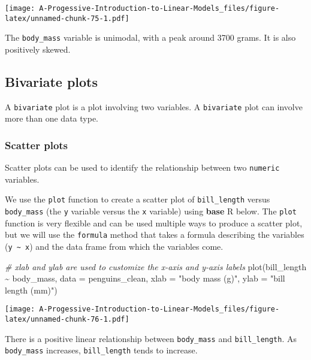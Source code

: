 \documentclass[
]{book}
\newenvironment{Shaded}{\begin{snugshade}}{\end{snugshade}}
\newcommand{\AttributeTok}[1]{\textcolor[rgb]{0.77,0.63,0.00}{#1}}
\newcommand{\CommentTok}[1]{\textcolor[rgb]{0.56,0.35,0.01}{\textit{#1}}}
\newcommand{\FunctionTok}[1]{\textcolor[rgb]{0.00,0.00,0.00}{#1}}
\newcommand{\NormalTok}[1]{#1}
\newcommand{\SpecialCharTok}[1]{\textcolor[rgb]{0.00,0.00,0.00}{#1}}
\newcommand{\StringTok}[1]{\textcolor[rgb]{0.31,0.60,0.02}{#1}}
\theoremstyle{definition}
\theoremstyle{definition}
\theoremstyle{definition}
\theoremstyle{definition}
\theoremstyle{remark}
\begin{document}
\texttt{[image: A-Progessive-Introduction-to-Linear-Models\_files/figure-latex/unnamed-chunk-75-1.pdf]}

The \texttt{body\_mass} variable is unimodal, with a peak around 3700 grams. It is also positively skewed.

\hypertarget{bivariate-plots}{%
\subsection{Bivariate plots}\label{bivariate-plots}}

A \texttt{bivariate} plot is a plot involving two variables. A \texttt{bivariate} plot can involve more than one data type.

\hypertarget{scatter-plots}{%
\subsubsection{Scatter plots}\label{scatter-plots}}

Scatter plots can be used to identify the relationship between two \texttt{numeric} variables.

We use the \texttt{plot} function to create a scatter plot of \texttt{bill\_length} versus \texttt{body\_mass} (the \texttt{y} variable versus the \texttt{x} variable) using \textbf{base} R below. The \texttt{plot} function is very flexible and can be used multiple ways to produce a scatter plot, but we will use the \texttt{formula} method that takes a formula describing the variables (\texttt{y\ \textasciitilde{}\ x}) and the data frame from which the variables come.

\begin{Shaded}
\begin{Highlighting}[]
\CommentTok{\# xlab and ylab are used to customize the x{-}axis and y{-}axis labels}
\FunctionTok{plot}\NormalTok{(bill\_length }\SpecialCharTok{\textasciitilde{}}\NormalTok{ body\_mass, }\AttributeTok{data =}\NormalTok{ penguins\_clean,}
     \AttributeTok{xlab =} \StringTok{"body mass (g)"}\NormalTok{, }\AttributeTok{ylab =} \StringTok{"bill length (mm)"}\NormalTok{)}
\end{Highlighting}
\end{Shaded}

\texttt{[image: A-Progessive-Introduction-to-Linear-Models\_files/figure-latex/unnamed-chunk-76-1.pdf]}

There is a positive linear relationship between \texttt{body\_mass} and \texttt{bill\_length}. As \texttt{body\_mass} increases, \texttt{bill\_length} tends to increase.
\end{document}
